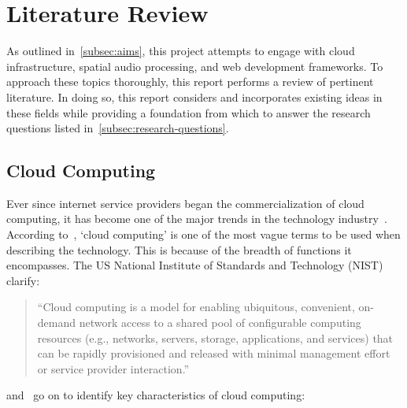 
\thispagestyle{plain}
\newpage
\section{Literature Review}\label{sec:literature-review}

\normalsize

As outlined in~\ref{subsec:aims}, this project attempts to engage with cloud infrastructure, spatial audio processing, and web development frameworks.
To approach these topics thoroughly, this report performs a review of pertinent literature.
In doing so, this report considers and incorporates existing ideas in these fields while providing a foundation from which to answer the research questions listed in~\ref{subsec:research-questions}.

\subsection{Cloud Computing}\label{subsec:cloud-computing}

Ever since internet service providers began the commercialization of cloud computing,
it has become one of the major trends in the technology industry~\citep{cc_overview}.
According to~\citet{cc_overview}, `cloud computing' is one of the most vague terms to be used when describing the technology.
This is because of the breadth of functions it encompasses.
The US National Institute of Standards and Technology (NIST) clarify:

\begin{quotation}
    ``Cloud computing is a model for enabling ubiquitous, convenient, on-demand network access to a shared pool of configurable computing resources (e.g., networks, servers, storage, applications, and services) that can be rapidly provisioned and released with minimal management effort or service provider interaction.''~\citep{mell2011nist}
\end{quotation}\citet{mell2011nist} and~\citet{marinescu-cloud} go on to identify key characteristics of cloud computing:

